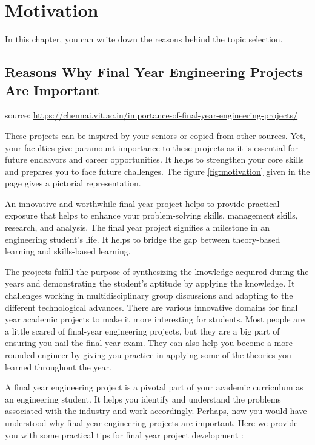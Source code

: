 \chapter{Motivation}

In this chapter, you can write down the reasons behind the topic selection. 

\section{Reasons Why Final Year Engineering Projects Are Important} 
source:
\def\UrlFont{\em}
 \url{https://chennai.vit.ac.in/importance-of-final-year-engineering-projects/}

These projects can be inspired by your seniors or copied from other sources. Yet, your faculties give paramount importance to these projects as it is essential for future endeavors and career opportunities. It helps to strengthen your core skills and prepares you to face future challenges. The figure \ref{fig:motivation} given in the page \pageref{fig:motivation} gives a pictorial representation.

An innovative and worthwhile final year project helps to provide practical exposure that helps to enhance your problem-solving skills, management skills, research, and analysis. The final year project signifies a milestone in an engineering student’s life. It helps to bridge the gap between theory-based learning and skills-based learning.

The projects fulfill the purpose of synthesizing the knowledge acquired during the years and demonstrating the student’s aptitude by applying the knowledge. It challenges working in multidisciplinary group discussions and adapting to the different technological advances. There are various innovative domains for final year academic projects to make it more interesting for students.
Most people are a little scared of final-year engineering projects, but they are a big part of ensuring you nail the final year exam. They can also help you become a more rounded engineer by giving you practice in applying some of the theories you learned throughout the year.

A final year engineering project is a pivotal part of your academic curriculum as an engineering student. It helps you identify and understand the problems associated with the industry and work accordingly. Perhaps, now you would have understood why final-year engineering projects are important.
Here we provide you with some practical tips for final year project development :

